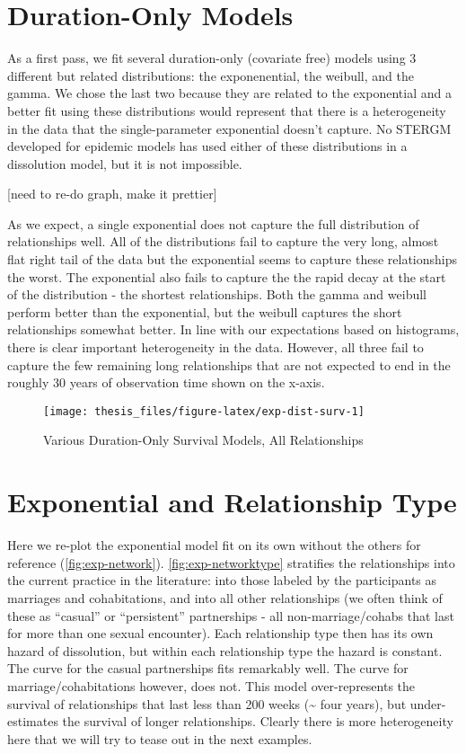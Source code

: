 \documentclass [11pt, proquest] {uwthesis}[2015/03/03]
\begin{document}
\section{Duration-Only Models}\label{duration-only-models}

As a first pass, we fit several duration-only (covariate free) models
using 3 different but related distributions: the exponenential, the
weibull, and the gamma. We chose the last two because they are related
to the exponential and a better fit using these distributions would
represent that there is a heterogeneity in the data that the
single-parameter exponential doesn't capture. No STERGM developed for
epidemic models has used either of these distributions in a dissolution
model, but it is not impossible.

{[}need to re-do graph, make it prettier{]}

As we expect, a single exponential does not capture the full
distribution of relationships well. All of the distributions fail to
capture the very long, almost flat right tail of the data but the
exponential seems to capture these relationships the worst. The
exponential also fails to capture the the rapid decay at the start of
the distribution - the shortest relationships. Both the gamma and
weibull perform better than the exponential, but the weibull captures
the short relationships somewhat better. In line with our expectations
based on histograms, there is clear important heterogeneity in the data.
However, all three fail to capture the few remaining long relationships
that are not expected to end in the roughly 30 years of observation time
shown on the x-axis.
\begin{figure}

{\centering \texttt{[image: thesis\_files/figure-latex/exp-dist-surv-1]} 

}

\caption{Various Duration-Only Survival Models, All Relationships}\label{fig:exp-dist-surv}
\end{figure}
\section{Exponential and Relationship
Type}\label{exponential-and-relationship-type}

Here we re-plot the exponential model fit on its own without the others
for reference (\ref{fig:exp-network}). \ref{fig:exp-networktype}
stratifies the relationships into the current practice in the
literature: into those labeled by the participants as marriages and
cohabitations, and into all other relationships (we often think of these
as ``casual'' or ``persistent'' partnerships - all non-marriage/cohabs
that last for more than one sexual encounter). Each relationship type
then has its own hazard of dissolution, but within each relationship
type the hazard is constant. The curve for the casual partnerships fits
remarkably well. The curve for marriage/cohabitations however, does not.
This model over-represents the survival of relationships that last less
than 200 weeks (\textasciitilde{} four years), but under-estimates the
survival of longer relationships. Clearly there is more heterogeneity
here that we will try to tease out in the next examples.
\end{document}
